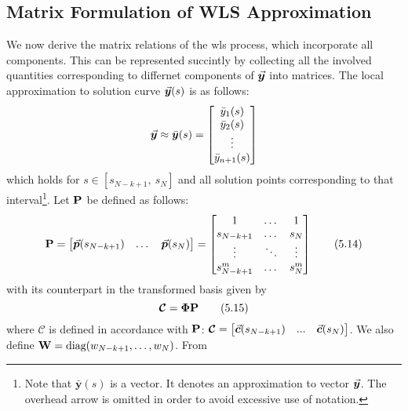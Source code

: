 \subsection{Matrix Formulation of WLS Approximation}\label{CH5-S2SS1}

We now
derive the matrix relations of the \acrshort{wls} process, which incorporate 
all 
components. This can be represented succintly by collecting all the involved 
quantities corresponding to differnet components of $\vec{\bm{y}}$ into matrices. 
The local approximation to solution curve $\vec{\bm{y}}(s)$ is as follows:
\begin{equation*}
	\vec{\bm{y}}\approx \bar{\bm{y}}(s)=\begin{bmatrix}
		\bar{y}_1(s)\\ \bar{y}_2(s)\\ \vdots \\ \bar{y}_{n+1}(s)
	\end{bmatrix}
\end{equation*}
which holds for $s\in[s_{N-k+1},\ s_N]$ and all solution points 
corresponding to that interval\footnote{Note that $\bar{\bm{y}}(s)$ is a 
vector. 
It denotes an approximation to vector $\vec{\bm{y}}$. The overhead arrow is omitted 
in order to avoid excessive use of notation.}. Let $\mathbf{P}$ be defined as 
follows:
\begin{equation}
	\mathbf{P}=\begin{bmatrix}
		\vec{\bm{p}}(s_{N-k+1}) & \dots & \vec{\bm{p}}(s_N)
	\end{bmatrix}=\begin{bmatrix}
		1 &  \dots & 1\\
		s_{N-k+1} & \dots & s_N\\
		\vdots & \ddots & \vdots\\
		s_{N-k+1}^m & \dots & s_N^m
	\end{bmatrix}
	\tag{5.14}\label{eq:P}
\end{equation}
with its counterpart  in the transformed basis given by
\begin{equation}
	\bm{\mathcal{C}}=\mathbf{\Phi}\mathbf{P}
	\tag{5.15}\label{eq:TransMat}
\end{equation}
where $\bm{\mathcal{C}}$ is defined in accordance with $\mathbf{P}$: 
$\bm{\mathcal{C}}= 
\begin{bmatrix}
	\vec{\bm{c}}(s_{N-k+1}) & ... & \vec{\bm{c}}(s_N)
\end{bmatrix}$. We also define $\mathbf{W}=\text{diag}(w_{N-k+1},\dots,w_N)$. From
